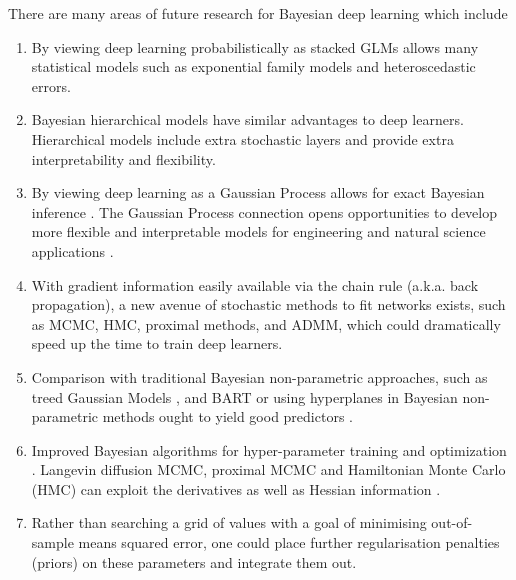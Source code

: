\documentclass[12pt]{article}
\begin{document}
There are many areas of future research for Bayesian deep learning which include
\begin{enumerate}[label=(\roman*)]
	\item By viewing deep learning probabilistically as stacked GLMs allows many statistical models such as exponential family models and heteroscedastic errors.
	\item  Bayesian hierarchical models have similar advantages to deep learners. Hierarchical models include extra stochastic layers and provide extra interpretability and flexibility. 
	\item By viewing deep learning as a Gaussian Process allows for exact Bayesian inference \cite{neal1996priors, williams1997computing,lee2017deep}. The Gaussian Process connection opens opportunities to develop more flexible and interpretable models for engineering \cite{gramacy2011particle} and natural science applications \cite{banerjee2008gaussian}.
	\item With gradient information easily available via the chain rule (a.k.a. back propagation), a new avenue of stochastic methods to fit networks exists, such as MCMC, HMC, proximal methods, and ADMM, which could dramatically speed up the time to train deep learners.
	\item Comparison with traditional Bayesian non-parametric approaches, such as treed Gaussian Models \citep{gramacy2005bayesian}, and BART \citep{chipman2010bart} or using hyperplanes in Bayesian non-parametric methods ought to yield good predictors \citep{bass2017}. 
	\item Improved Bayesian algorithms for hyper-parameter training and optimization \citep{snoek2012practical}. Langevin diffusion MCMC, proximal MCMC and Hamiltonian Monte Carlo (HMC) can exploit the derivatives as well as Hessian information \citep{polson_proximal_2015,polson2015statistical,dean_large_2012}.
	\item Rather than searching a grid of values with a goal of minimising out-of-sample means squared error, one could place further regularisation penalties (priors) on these parameters and integrate them out.
\end{enumerate}
\end{document}
